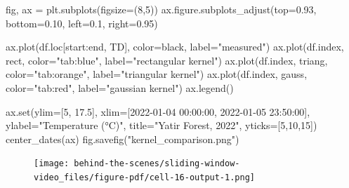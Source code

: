 \documentclass[
  letterpaper,
  DIV=11,
  numbers=noendperiod,
  oneside]{scrreprt}
\newenvironment{Shaded}{\begin{snugshade}}{\end{snugshade}}
\newcommand{\BuiltInTok}[1]{\textcolor[rgb]{0.00,0.23,0.31}{#1}}
\newcommand{\DecValTok}[1]{\textcolor[rgb]{0.68,0.00,0.00}{#1}}
\newcommand{\FloatTok}[1]{\textcolor[rgb]{0.68,0.00,0.00}{#1}}
\newcommand{\NormalTok}[1]{\textcolor[rgb]{0.00,0.23,0.31}{#1}}
\newcommand{\OperatorTok}[1]{\textcolor[rgb]{0.37,0.37,0.37}{#1}}
\newcommand{\StringTok}[1]{\textcolor[rgb]{0.13,0.47,0.30}{#1}}
\begin{document}
\begin{Shaded}
\begin{Highlighting}[]
\NormalTok{fig, ax }\OperatorTok{=}\NormalTok{ plt.subplots(figsize}\OperatorTok{=}\NormalTok{(}\DecValTok{8}\NormalTok{,}\DecValTok{5}\NormalTok{))}
\NormalTok{ax.figure.subplots\_adjust(top}\OperatorTok{=}\FloatTok{0.93}\NormalTok{, bottom}\OperatorTok{=}\FloatTok{0.10}\NormalTok{, left}\OperatorTok{=}\FloatTok{0.1}\NormalTok{, right}\OperatorTok{=}\FloatTok{0.95}\NormalTok{)}

\NormalTok{ax.plot(df.loc[start:end, }\StringTok{\textquotesingle{}TD\textquotesingle{}}\NormalTok{], color}\OperatorTok{=}\StringTok{\textquotesingle{}black\textquotesingle{}}\NormalTok{, label}\OperatorTok{=}\StringTok{"measured"}\NormalTok{)}
\NormalTok{ax.plot(df.index, rect, color}\OperatorTok{=}\StringTok{"tab:blue"}\NormalTok{, label}\OperatorTok{=}\StringTok{"rectangular kernel"}\NormalTok{)}
\NormalTok{ax.plot(df.index, triang, color}\OperatorTok{=}\StringTok{"tab:orange"}\NormalTok{, label}\OperatorTok{=}\StringTok{"triangular kernel"}\NormalTok{)}
\NormalTok{ax.plot(df.index, gauss, color}\OperatorTok{=}\StringTok{"tab:red"}\NormalTok{, label}\OperatorTok{=}\StringTok{"gaussian kernel"}\NormalTok{)}
\NormalTok{ax.legend()}

\NormalTok{ax.}\BuiltInTok{set}\NormalTok{(ylim}\OperatorTok{=}\NormalTok{[}\DecValTok{5}\NormalTok{, }\FloatTok{17.5}\NormalTok{],}
\NormalTok{       xlim}\OperatorTok{=}\NormalTok{[}\StringTok{\textquotesingle{}2022{-}01{-}04 00:00:00\textquotesingle{}}\NormalTok{, }\StringTok{\textquotesingle{}2022{-}01{-}05 23:50:00\textquotesingle{}}\NormalTok{],}
\NormalTok{       ylabel}\OperatorTok{=}\StringTok{"Temperature (°C)"}\NormalTok{,}
\NormalTok{       title}\OperatorTok{=}\StringTok{"Yatir Forest, 2022"}\NormalTok{,}
\NormalTok{       yticks}\OperatorTok{=}\NormalTok{[}\DecValTok{5}\NormalTok{,}\DecValTok{10}\NormalTok{,}\DecValTok{15}\NormalTok{])}
\NormalTok{center\_dates(ax)}
\NormalTok{fig.savefig(}\StringTok{"kernel\_comparison.png"}\NormalTok{)}
\end{Highlighting}
\end{Shaded}

\begin{figure}[H]

{\centering \texttt{[image: behind-the-scenes/sliding-window-video\_files/figure-pdf/cell-16-output-1.png]}

}

\end{figure}
\end{document}
